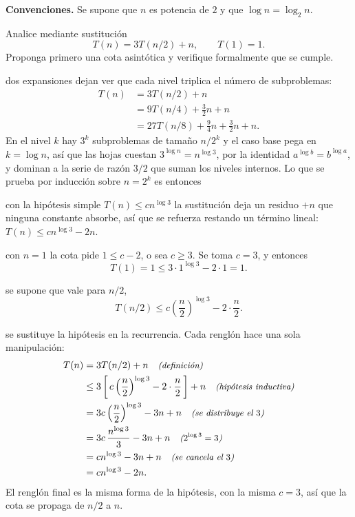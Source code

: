 \documentclass[11pt,letterpaper]{article}
\begin{document}

\noindent\textbf{Convenciones.}
Se supone que $n$ es potencia de $2$ y que
$\log n = \log_2 n$.

\noindent Analice mediante sustitución
\[
  T(n) = 3T(n/2) + n, \qquad T(1) = 1.
\]
Proponga primero una cota asintótica y verifique formalmente que se
cumple.

 dos expansiones dejan ver que cada
nivel triplica el número de subproblemas:
\begin{align*}
  T(n) &= 3T(n/2) + n \\
       &= 9T(n/4) + \tfrac{3}{2}n + n \\
       &= 27T(n/8) + \tfrac{9}{4}n + \tfrac{3}{2}n + n.
\end{align*}
En el nivel $k$ hay $3^k$ subproblemas de tamaño $n/2^k$ y el caso
base pega en $k = \log n$, así que las hojas cuestan
$3^{\log n} = n^{\log 3}$, por la identidad $a^{\log b} = b^{\log a}$,
y dominan a la serie de razón $3/2$ que suman los niveles internos. Lo
que se prueba por inducción sobre $n = 2^k$ es entonces

 con la hipótesis simple $T(n) \le cn^{\log 3}$
la sustitución deja un residuo $+n$ que ninguna constante absorbe, así
que se refuerza restando un término lineal: $T(n) \le cn^{\log 3} - 2n$.

 con $n = 1$ la cota pide $1 \le c - 2$, o sea
$c \ge 3$. Se toma $c = 3$, y entonces
\[
  T(1) = 1 \le 3 \cdot 1^{\log 3} - 2 \cdot 1 = 1.
\]

 se supone que vale para $n/2$,
\[
  T(n/2) \le c\left(\frac{n}{2}\right)^{\log 3} - 2 \cdot \frac{n}{2}.
\]

 se sustituye la hipótesis en la recurrencia.
Cada renglón hace una sola manipulación:
\begin{align*}
  T(n) &= 3T(n/2) + n \quad\text{\small\itshape (definición)} \\
       &\le 3\left[\, c\left(\frac{n}{2}\right)^{\log 3}
          - 2 \cdot \frac{n}{2} \,\right] + n
          \quad\text{\small\itshape (hipótesis inductiva)} \\
       &= 3c\left(\frac{n}{2}\right)^{\log 3} - 3n + n
          \quad\text{\small\itshape (se distribuye el $3$)} \\
       &= 3c\,\frac{n^{\log 3}}{3} - 3n + n
          \quad\text{\small\itshape ($2^{\log 3} = 3$)} \\
       &= cn^{\log 3} - 3n + n \quad\text{\small\itshape (se cancela el $3$)} \\
       &= cn^{\log 3} - 2n.
\end{align*}
El renglón final es la misma forma de la hipótesis, con la misma
$c = 3$, así que la cota se propaga de $n/2$ a $n$.
\end{document}
